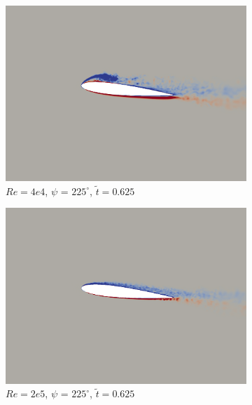 \begin{figure}[H]
	\begin{subfigure}[b]{0.32\textwidth}
		\centering
		\includegraphics[width=1\textwidth]{figures/Vorticity_plots/Re_40k_1pt0/phase_225.png}
		\caption{$Re=4e4$, $\psi$ = $225^\circ$, $\tilde{t}=0.625$}
		\label{fig:Re_40k_1pt0_phi225}
	\end{subfigure}
	\begin{subfigure}[b]{0.32\textwidth}
		\centering
		\includegraphics[width=1\textwidth]{figures/Vorticity_plots/Re_200k_1pt0/phase_225.png}
		\caption{$Re=2e5$, $\psi$ = $225^\circ$,  $\tilde{t}=0.625$}
		\label{fig:Re_200k_1pt0_phi225}
	\end{subfigure}
	\begin{subfigure}[b]{0.32\textwidth}
		\centering

\end{subfigure}
\end{figure}
